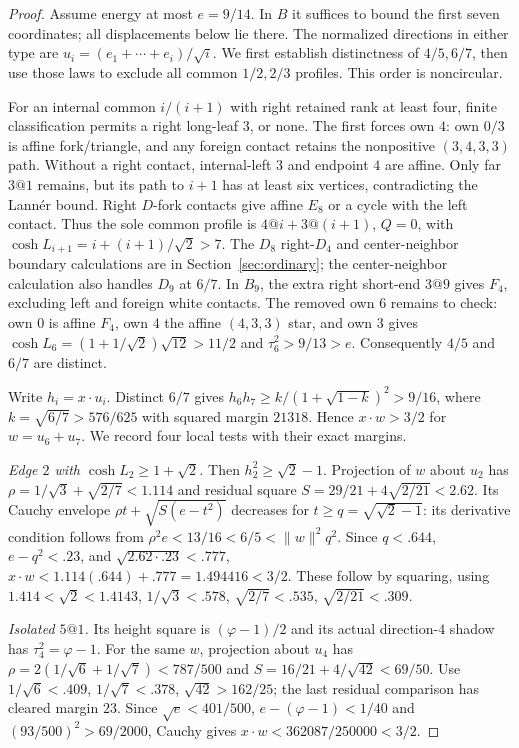 \documentclass[11pt]{article}
\theoremstyle{remark}
\newcommand{\ph}{\varphi}
\begin{document}
\begin{proof}
Assume energy at most $e=9/14$. In $B$ it suffices to bound the first
seven coordinates; all displacements below lie there. The normalized
directions in either type are $u_i=(e_1+\cdots+e_i)/\sqrt i$.
We first establish distinctness of $4/5,6/7$, then use those laws to
exclude all common $1/2,2/3$ profiles. This order is noncircular.

For an internal common $i/(i+1)$ with right retained rank at least
four, finite classification permits a right long-leaf $3$, or none.
The first forces own $4$: own $0/3$ is affine fork/triangle, and
any foreign contact retains the nonpositive $(3,4,3,3)$ path.
Without a right contact, internal-left $3$ and endpoint $4$ are
affine. Only far $3@1$ remains, but its path to $i+1$ has at least
six vertices, contradicting the Lann\'er bound. Right $D$-fork
contacts give affine $E_8$ or a cycle with the left contact.
Thus the sole common profile is $4@i+3@(i+1)$, $Q=0$, with
$\cosh L_{i+1}=i+(i+1)/\sqrt2>7$.
The $D_8$ right-$D_4$ and center-neighbor boundary calculations are
in Section~\ref{sec:ordinary}; the center-neighbor calculation also
handles $D_9$ at $6/7$.
In $B_9$, the extra right short-end $3@9$ gives $F_4$, excluding
left and foreign white contacts. The removed own $6$ remains to check:
own $0$ is affine $F_4$, own $4$ the affine $(4,3,3)$ star, and own
$3$ gives $\cosh L_6=(1+1/\sqrt2)\sqrt{12}>11/2$ and
$\tau_6^2>9/13>e$. Consequently $4/5$ and $6/7$ are distinct.

Write $h_i=x\cdot u_i$. Distinct $6/7$ gives
$h_6h_7\ge k/(1+\sqrt{1-k})^2>9/16$, where
$k=\sqrt{6/7}>576/625$ with squared margin $21318$.
Hence $x\cdot w>3/2$ for $w=u_6+u_7$.
We record four local tests with their exact margins.

\emph{Edge $2$ with $\cosh L_2\ge1+\sqrt2$.}
Then $h_2^2\ge\sqrt2-1$. Projection of $w$ about $u_2$ has
$\rho=1/\sqrt3+\sqrt{2/7}<1.114$ and residual square
$S=29/21+4\sqrt{2/21}<2.62$.
Its Cauchy envelope $\rho t+\sqrt{S(e-t^2)}$ decreases for
$t\ge q=\sqrt{\sqrt2-1}$: its derivative condition follows from
$\rho^2e<13/16<6/5<\|w\|^2q^2$.
Since $q<.644$, $e-q^2<.23$, and $\sqrt{2.62\cdot.23}<.777$,
$x\cdot w<1.114(.644)+.777=1.494416<3/2$.
These follow by squaring, using $1.414<\sqrt2<1.4143$,
$1/\sqrt3<.578$, $\sqrt{2/7}<.535$, $\sqrt{2/21}<.309$.

\emph{Isolated $5@1$.}
Its height square is $(\ph-1)/2$ and its actual direction-$4$
shadow has $\tau_4^2=\ph-1$. For the same $w$, projection about
$u_4$ has $\rho=2(1/\sqrt6+1/\sqrt7)<787/500$ and
$S=16/21+4/\sqrt{42}<69/50$. Use
$1/\sqrt6<.409$, $1/\sqrt7<.378$, $\sqrt{42}>162/25$;
the last residual comparison has cleared margin $23$.
Since $\sqrt e<401/500$, $e-(\ph-1)<1/40$ and
$(93/500)^2>69/2000$, Cauchy gives
$x\cdot w<362087/250000<3/2$.


\end{proof}
\end{document}
